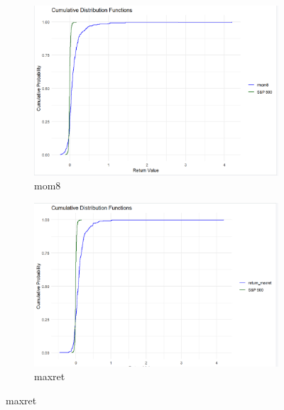 \documentclass{article}
\begin{document}
\begin{figure}[H]
    \begin{subfigure}{0.45\textwidth}
        \centering
        \includegraphics[width=\textwidth]{29.png}
        \caption{mom8}
        \label{fig:image29}
    \end{subfigure}
    \hspace{0.05\textwidth}
    \begin{subfigure}{0.45\textwidth}
        \centering
        \includegraphics[width=\textwidth]{30.png}
        \caption{maxret}
        \label{fig:image30}
    \end{subfigure}


\end{figure}
\end{document}
